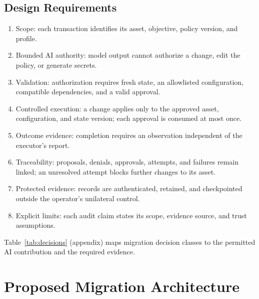\documentclass[journal]{IEEEtran}
\begin{document}
\subsection{Design Requirements}
\begin{enumerate}
\item Scope: each transaction identifies its asset, objective, policy version, and profile.
\item Bounded AI authority: model output cannot authorize a change, edit the policy, or generate secrets.
\item Validation: authorization requires fresh state, an allowlisted configuration, compatible dependencies, and a valid approval.
\item Controlled execution: a change applies only to the approved asset, configuration, and state version; each approval is consumed at most once.
\item Outcome evidence: completion requires an observation independent of the executor's report.
\item Traceability: proposals, denials, approvals, attempts, and failures remain linked; an unresolved attempt blocks further changes to its asset.
\item Protected evidence: records are authenticated, retained, and checkpointed outside the operator's unilateral control.
\item Explicit limits: each audit claim states its scope, evidence source, and trust assumptions.
\end{enumerate}
Table~\ref{tab:decisions} (appendix) maps migration decision classes to the permitted AI contribution and the required evidence.

\section{Proposed Migration Architecture}
\label{sec:arch}
\end{document}
